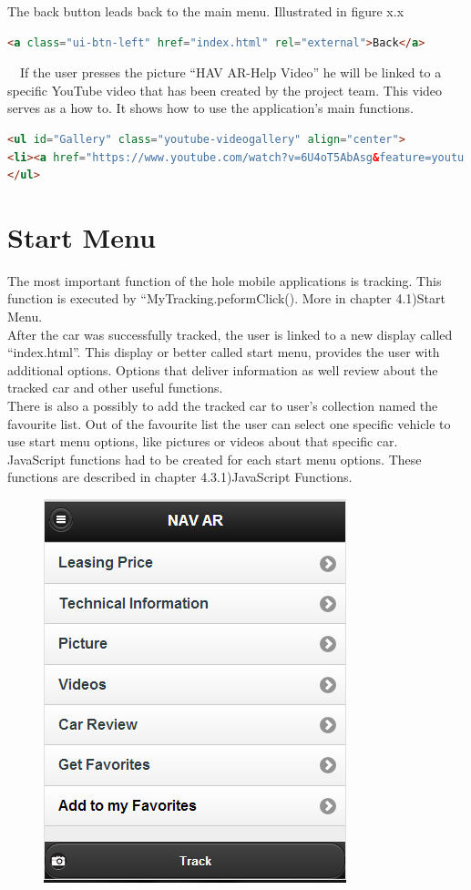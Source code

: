 The back button leads back to the main menu. Illustrated in figure x.x
\\
\begin{lstlisting}[language=html, caption= 
back button,captionpos=b]
<a class="ui-btn-left" href="index.html" rel="external">Back</a>
\end{lstlisting}
\
\
If the user presses the picture “HAV AR-Help Video” he will be linked to a specific YouTube video that has been created by the project team. This video serves as a how to. It shows how to use the application’s main functions.
\\
\begin{lstlisting}[language=html, caption= 
help video,captionpos=b]
<ul id="Gallery" class="youtube-videogallery" align="center">
<li><a href="https://www.youtube.com/watch?v=6U4oT5AbAsg&feature=youtu.be">NAV AR-Help Video</a></li>
</ul>
\end{lstlisting}

\section{Start Menu}
The most important function of the hole mobile applications is tracking. This function is executed by “MyTracking.peformClick(). More in chapter 4.1)Start Menu.
\\

After the car was successfully tracked, the user is linked to a new display called “index.html”. This display or better called start menu, provides the user with additional options. Options that deliver information as well review about the tracked car and other useful functions. 
\\

There is also a possibly to add the tracked car to user’s collection named the favourite list. Out of the favourite list the user can select one specific vehicle to use start menu options, like pictures or videos about that specific car.  
\\

JavaScript functions had to be created for each start menu options. These functions are described in chapter 4.3.1)JavaScript Functions.
\\

\begin{figure}[]
\centering
\includegraphics[width=0.5\linewidth]{graphics/chapter4/3}
\caption{}
\label{fig:3}
\end{figure}
\newpage

